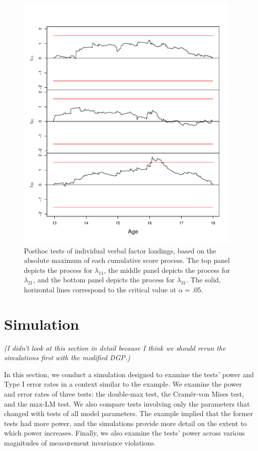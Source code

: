 \documentclass[man]{apa}
\newcommand{\readme}[1]{\emph{\marginpar{README} (#1)}}
\begin{document}
\begin{figure}
\caption{Posthoc tests of individual verbal factor loadings, based on
  the absolute maximum of each cumulative score process.  The top
  panel depicts the process for $\lambda_{11}$, the middle panel
  depicts the process for $\lambda_{21}$, and the bottom panel depicts
  the process for $\lambda_{31}$.  The solid, horizontal lines
  correspond to the critical value at $\alpha=.05$.}
\label{fig:lambdas}
\includegraphics[height=5in]{gefp_lambdas.pdf}
\end{figure}

\section{Simulation}

\readme{I didn't look at this section in detail because I think we
should rerun the simulations first with the modified DGP.}

In this section, we conduct a simulation designed to
examine the tests' power and Type I error rates in a context
similar to the example.
We examine the power and error rates of three tests: the double-max test, the
Cram\'{e}r-von Mises test, and the max-LM test.  We also compare 
tests involving only the parameters that changed with tests of all model
parameters.  The example implied that the former tests had more
power, and the simulations provide more detail on the extent to which
power increases.  Finally, we also examine the tests' power across
various magnitudes of measurement invariance violations.
\end{document}
